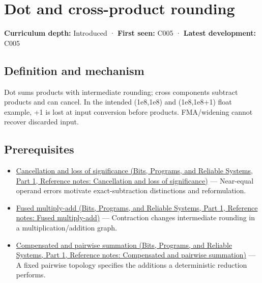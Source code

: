 \hypertarget{appendix-5aef4f13483a}{}\label{referencestart:appendix-5aef4f13483a}
\section{Dot and cross-product rounding}\label{appendix-5aef4f13483a-dot-and-cross-product-rounding}

\hypertarget{appendix-5aef4f13483a-dot-and-cross-product-rounding}{}

\textbf{Curriculum depth:} Introduced · \textbf{First seen:} C005 · \textbf{Latest development:} C005

\begin{allmightroledefinition}

\subsection{Definition and mechanism}\label{appendix-5aef4f13483a-definition-and-mechanism}

\hypertarget{appendix-5aef4f13483a-definition-and-mechanism}{}

Dot sums products with intermediate rounding; cross components subtract products and can cancel. In the intended (1e8,1e8) and (1e8,1e8+1) float example, +1 is lost at input conversion before products. FMA/widening cannot recover discarded input.

\end{allmightroledefinition}

\subsection{Prerequisites}\label{appendix-5aef4f13483a-prerequisites}

\hypertarget{appendix-5aef4f13483a-prerequisites}{}

\begin{itemize}
\tightlist
\item
  \href{../01-Bits-Programs-and-Reliable-Systems-P01/main.pdf\#nameddest=appendix-a2773a6a2f9d}{Cancellation and loss of significance (Bits, Programs, and Reliable Systems, Part 1, Reference notes: Cancellation and loss of significance)} --- Near-equal operand errors motivate exact-subtraction distinctions and reformulation.
\item
  \href{../01-Bits-Programs-and-Reliable-Systems-P01/main.pdf\#nameddest=appendix-41e8ef22a21e}{Fused multiply-add (Bits, Programs, and Reliable Systems, Part 1, Reference notes: Fused multiply-add)} --- Contraction changes intermediate rounding in a multiplication/addition graph.
\item
  \href{../01-Bits-Programs-and-Reliable-Systems-P01/main.pdf\#nameddest=appendix-df318da57389}{Compensated and pairwise summation (Bits, Programs, and Reliable Systems, Part 1, Reference notes: Compensated and pairwise summation)} --- A fixed pairwise topology specifies the additions a deterministic reduction performs.
\end{itemize}

